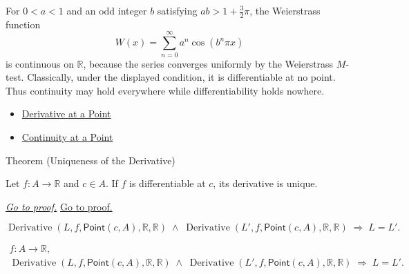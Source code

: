 \begin{exposition}
\label{ex:weierstrass}
For \(0<a<1\) and an odd integer \(b\) satisfying
\(ab>1+\frac{3}{2}\pi\), the Weierstrass function
\[
  W(x)=\sum_{n=0}^{\infty}a^n\cos(b^n\pi x)
\]
is continuous on \(\mathbb{R}\), because the series converges uniformly by
the Weierstrass \(M\)-test. Classically, under the displayed condition, it is
differentiable at no point. Thus continuity may hold everywhere while
differentiability holds nowhere.
\end{exposition}

\begin{dependencies}
\begin{itemize}
  \item \hyperref[def:derivative-at-a-point]{Derivative at a Point}
  \item \hyperref[def:continuous-at-point]{Continuity at a Point}
\end{itemize}
\end{dependencies}


\begin{theorembox}{Theorem (Uniqueness of the Derivative)}
\begin{theorem}
\label{thm:uniqueness-of-the-derivative}
Let $f : A \to \mathbb{R}$ and $c \in A$. If $f$ is differentiable at $c$, its derivative is unique.

\smallskip\noindent
\hyperref[prf:uniqueness-of-the-derivative]{\textit{Go to proof.}}
\hyperref[prf:uniqueness-of-the-derivative]{Go to proof.}
\end{theorem}
\end{theorembox}

\begin{remark*}
\[
\operatorname{Derivative}(L,f,\mathsf{Point}(c,A),\mathbb R,\mathbb R)
\;\land\;
\operatorname{Derivative}(L',f,\mathsf{Point}(c,A),\mathbb R,\mathbb R)
\;\Rightarrow\; L = L'.
\]
\end{remark*}

\begin{remark*}
\[
\begin{aligned}
  f\colon A\to\mathbb{R},\\
\operatorname{Derivative}(L,f,\mathsf{Point}(c,A),\mathbb R,\mathbb R)
\;\land\;
\operatorname{Derivative}(L',f,\mathsf{Point}(c,A),\mathbb R,\mathbb R)
\;\Longrightarrow\; L = L'.
\end{aligned}
\]
\end{remark*}

